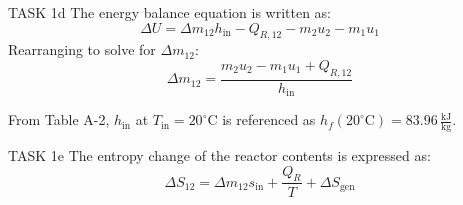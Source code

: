 TASK 1d  
The energy balance equation is written as:  
\[
\Delta U = \Delta m_{12} h_{\text{in}} - Q_{R,12} - m_2 u_2 - m_1 u_1
\]  
Rearranging to solve for \( \Delta m_{12} \):  
\[
\Delta m_{12} = \frac{m_2 u_2 - m_1 u_1 + Q_{R,12}}{h_{\text{in}}}
\]  

From Table A-2, \( h_{\text{in}} \) at \( T_{\text{in}} = 20^\circ\text{C} \) is referenced as \( h_f(20^\circ\text{C}) = 83.96 \, \frac{\text{kJ}}{\text{kg}} \).  

TASK 1e  
The entropy change of the reactor contents is expressed as:  
\[
\Delta S_{12} = \Delta m_{12} s_{\text{in}} + \frac{Q_{R}}{T} + \Delta S_{\text{gen}}
\]  